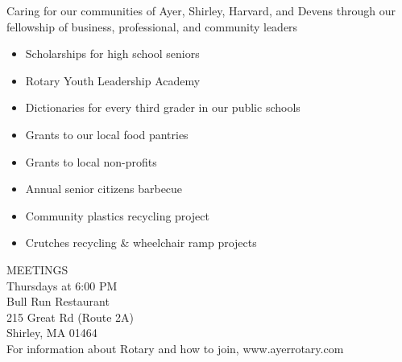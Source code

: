 \documentclass[12pt, letter, oneside]{article}
\begin{document}
\raggedright Caring for our communities of Ayer, Shirley, Harvard, and Devens through our fellowship of business, professional, and community leaders 
\begin{itemize}
\setlength\itemsep{0.1em}
\item Scholarships for high school seniors 
\item Rotary Youth Leadership Academy 
\item Dictionaries for every third grader in our public schools 
\item Grants to our local food pantries 
\item Grants to local non-profits 
\item Annual senior citizens barbecue 
\item Community plastics recycling project 
\item Crutches recycling \& wheelchair ramp projects
\end{itemize} 
\center MEETINGS\\ 
Thursdays at 6:00 PM \\ 
Bull Run Restaurant\\215 Great Rd (Route 2A)\\
Shirley, MA 01464 \\
For information about Rotary and how to join,
www.ayerrotary.com \\
\end{document}

